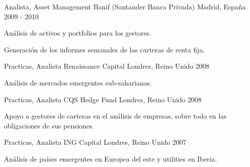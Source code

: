 \begin{cventries}
\cventry
    {Analista, Asset Management} %
    {Banif (Santander Banca Privada)} %
    {Madrid, España} %
    {2009 - 2010} %
    {
        \begin{cvitems} %
            \item {Análisis de activos y portfolios para los gestores.}
            \item {Generación de los informes semanales de las carteras de renta fija.}
        \end{cvitems}
    }

\cventry
    {Practicas, Analista} %
    {Renaissance Capital} %
    {Londres, Reino Unido} %
    {2008} %
    {
        \begin{cvitems} %
            \item {Análisis de mercados emergentes sub-saharianos.}
        \end{cvitems}
    }

\cventry
    {Practicas, Analista} %
    {CQS Hedge Fund} %
    {Londres, Reino Unido} %
    {2008} %
    {
        \begin{cvitems} %
            \item {Apoyo a gestores de carteras en el análisis de empresas, sobre todo en las obligaciones de sus pensiones.}
        \end{cvitems}
    }

\cventry
    {Practicas, Analista} %
    {ING Capital} %
    {Londres, Reino Unido} %
    {2007} %
    {
        \begin{cvitems} %
            \item {Análisis de países emergentes en Europea del este y utilities en Iberia.}
        \end{cvitems}
    }

\end{cventries}

